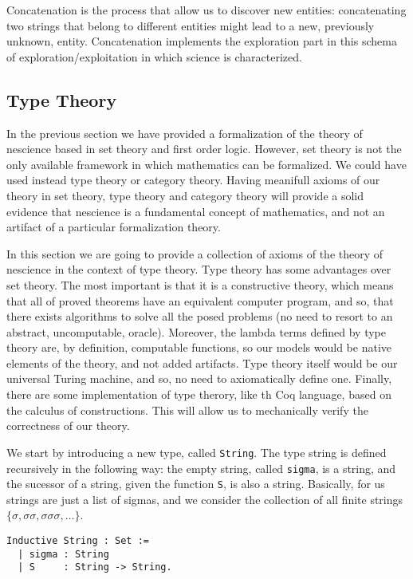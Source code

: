 Concatenation is the process that allow us to discover new entities: concatenating two strings
that belong to different entities might lead to a new, previously unknown, entity. Concatenation
implements the exploration part in this schema of exploration/exploitation in which science is
characterized.


\subsection{Type Theory}

In the previous section we have provided a formalization of the theory of nescience based in set theory and first order logic. However, set theory is not the only available framework in which mathematics can be formalized. We could have used instead type theory or category theory. Having meanifull axioms of our theory in set theory, type theory and category theory will provide a solid evidence that nescience is a fundamental concept of mathematics, and not an artifact of a particular formalization theory.

In this section we are going to provide a collection of axioms of the theory of nescience in the context of type theory. Type theory has some advantages over set theory. The most important is that it is a constructive theory, which means that all of proved theorems have an equivalent computer program, and so, that there exists algorithms to solve all the posed problems (no need to resort to an abstract, uncomputable, oracle). Moreover, the lambda terms defined by type theory are, by definition, computable functions, so our models would be native elements of the theory, and not added artifacts. Type theory itself would be our universal Turing machine, and so, no need to axiomatically define one. Finally, there are some implementation of type therory, like th Coq language, based on the calculus of constructions. This will allow us to mechanically verify the correctness of our theory.

We start by introducing a new type, called \texttt{String}. The type string is defined recursively in the following way: the empty string, called \texttt{sigma}, is a string, and the sucessor of a string, given the function \texttt{S}, is also a string. Basically, for us strings are just a list of sigmas, and we consider the collection of all finite strings $\{ \sigma, \sigma \sigma, \sigma \sigma \sigma, \ldots \}$.

\begin{sourcecode}
{\scriptsize \begin{verbatim}
Inductive String : Set :=
  | sigma : String
  | S     : String -> String.
\end{verbatim}}
\end{sourcecode}

